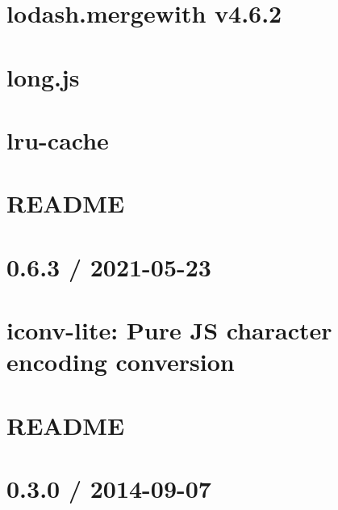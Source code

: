 \documentclass[twoside]{book}
\newcommand{\+}{\discretionary{\mbox{\scriptsize$\hookleftarrow$}}{}{}}
\begin{document}
\chapter{lodash.\+mergewith v4.6.2}
\label{md_src_nodejs_node_modules_lodash_mergewith_README}

\chapter{long.\+js}
\label{md_src_nodejs_node_modules_long_README}

\chapter{lru-\/cache}
\label{md_src_nodejs_node_modules_lru_cache_README}

\chapter{README}
\label{md_src_nodejs_node_modules_lru_min_README}

\chapter{0.6.3 / 2021-\/05-\/23}
\label{md_src_nodejs_node_modules_mariadb_node_modules_iconv_lite_Changelog}

\chapter{iconv-\/lite\+: Pure JS character encoding conversion}
\label{md_src_nodejs_node_modules_mariadb_node_modules_iconv_lite_README}

\chapter{README}
\label{md_src_nodejs_node_modules_mariadb_README}

\chapter{0.3.0 / 2014-\/09-\/07}
\label{md_src_nodejs_node_modules_media_typer_HISTORY}

\end{document}
